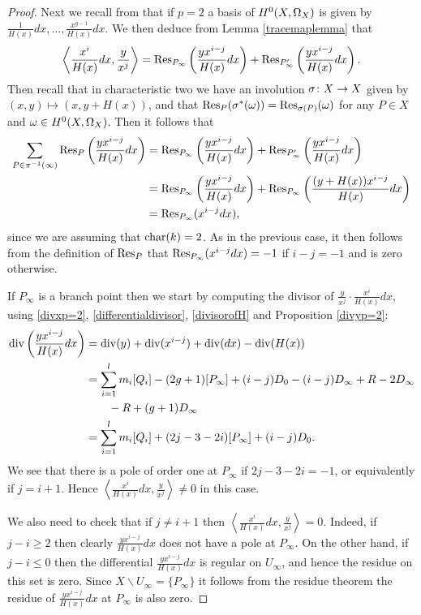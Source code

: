 \begin{proof}
    Next we recall from \cite[Prop. 7.4.26]{liu} that if $p=2$ a basis of ${H^0(X,\Omega_X)}$ is given by $\frac{1}{H(x)}dx, \ldots, \frac{x^{g-1}}{H(x)}dx$.
    We then deduce from Lemma \ref{tracemaplemma} that
        \[
        \left \langle \frac{x^i}{H(x)}dx, \frac{y}{x^j} \right \rangle = \operatorname{Res}_{P_\infty} \left( \frac{yx^{i-j}}{H(x)}dx \right) + \operatorname{Res}_{P_\infty'}\left( \frac{yx^{i-j}}{H(x)} dx \right).
        \]
    Then recall that in characteristic two we have an involution $\sigma \colon X \rightarrow X$ given by $(x,y) \mapsto (x, y + H(x))$, and that $\operatorname{Res}_P(\sigma^*(\omega)) = \operatorname{Res}_{\sigma(P)}(\omega)$ for any $P \in X$ and $\omega\in {H^0(X,\Omega_X)}$.
    Then it follows that
        \begin{align*}
        \sum_{P \in \pi^{-1}(\infty)} \operatorname{Res}_P \left( \frac{yx^{i-j}}{H(x)}dx \right) & = \operatorname{Res}_{P_\infty} \left( \frac{yx^{i-j}}{H(x)} dx \right) + \operatorname{Res}_{P_\infty'}\left( \frac{yx^{i-j}}{H(x)} dx\right) \\
        & = \operatorname{Res}_{P_ \infty} \left( \frac{yx^{i-j}}{H(x)}dx \right) + \operatorname{Res}_{P_ \infty} \left( \frac{(y+H(x))x^{i-j}}{H(x)}dx \right) \\
        & = \operatorname{Res}_{P_\infty}(x^{i-j}dx),
        \end{align*}
    since we are assuming that $\operatorname{char}(k) = 2$.
    As in the previous case, it then follows from the definition of $\operatorname{Res}_P$ that $\operatorname{Res}_{P_\infty}(x^{i-j}dx) = -1$ if $i-j = -1$ and is zero otherwise.
    
    
    
    If $P_\infty$ is a branch point then we start by computing the divisor of $ \frac{y}{x^j} \cdot \frac{x^i}{H(x)}dx$, using \eqref{divxp=2}, \eqref{differentialdivisor}, \eqref{divisorofH} and Proposition \ref{divyp=2}:
        \begin{align*}
        \operatorname{div}\left( \frac{yx^{i-j}}{H(x)}dx \right) & = \operatorname{div}(y) + \operatorname{div}(x^{i-j}) + \operatorname{div}( dx) - \operatorname{div}(H(x)) \\
        & = \sum_{i=1}^l m_i[Q_i] - (2g+ 1 )[P_\infty] + (i-j)D_0 - (i-j)D_\infty + R - 2D_\infty \\
        & \qquad - R + (g+1)D_\infty\\
        & = \sum_{i=1}^l m_i[Q_i] + (2j-3-2i)[P_\infty] + (i-j)D_0.
        \end{align*}
    We see that there is a pole of order one at $P_\infty$ if $2j - 3 - 2i = -1$, or equivalently if $j = i+1$.
    Hence $\left\langle \frac{x^i}{H(x)}dx, \frac{y}{x^j} \right\rangle \neq 0$ in this case.
    
    We also need to check that if $j \neq i+1$ then $\left \langle \frac{x^i}{H(x)}dx, \frac{y}{x^j} \right \rangle = 0$.
    Indeed, if $j-i \geq 2$ then clearly $\frac{yx^{i-j}}{H(x)}dx$ does not have a pole at $P_\infty$.
    On the other hand, if $j-i \leq 0$ then the differential $\frac{yx^{i-j}}{H(x)}dx$ is regular on $U_\infty$, and hence the residue on this set is zero.
    Since $X \backslash U_\infty = \{P_\infty\}$ it follows from the residue theorem the residue of $\frac{yx^{i-j}}{H(x)}dx$ at $P_\infty$ is also zero.
    \end{proof}


